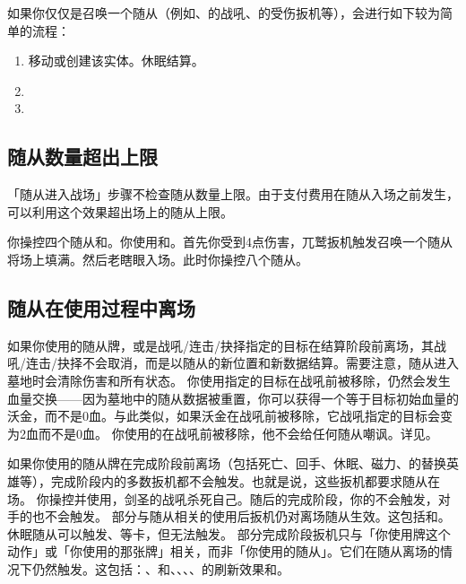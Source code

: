 如果你仅仅是召唤一个随从（例如、的战吼、的受伤扳机等），会进行如下较为简单的流程：
\begin{enumerate}
    \item 移动或创建该实体。休眠结算。
    \item {}
    \item {}
\end{enumerate}

\subsection{随从数量超出上限}

「随从进入战场」步骤不检查随从数量上限。由于支付费用在随从入场之前发生，可以利用这个效果超出场上的随从上限。

\example  你操控四个随从和。你使用和。首先你受到4点伤害，兀鹫扳机触发召唤一个随从将场上填满。然后老瞎眼入场。此时你操控八个随从。

\subsection{随从在使用过程中离场}

如果你使用的随从牌，或是战吼/连击/抉择指定的目标在结算阶段前离场，其战吼/连击/抉择不会取消，而是以随从的新位置和新数据结算。需要注意，随从进入墓地时会清除伤害和所有状态。
\example 你使用指定的目标在战吼前被移除，仍然会发生血量交换——因为墓地中的随从数据被重置，你可以获得一个等于目标初始血量的沃金，而不是0血。与此类似，如果沃金在战吼前被移除，它战吼指定的目标会变为2血而不是0血。
\example 你使用的在战吼前被移除，他不会给任何随从嘲讽。详见。

如果你使用的随从牌在完成阶段前离场（包括死亡、回手、休眠、磁力、的替换英雄等），完成阶段内的多数扳机都不会触发。也就是说，这些扳机都要求随从在场。
\example 你操控并使用，剑圣的战吼杀死自己。随后的完成阶段，你的不会触发，对手的也不会触发。
\exception 部分与随从相关的使用后扳机仍对离场随从生效。这包括和。
\exception 休眠随从可以触发、等卡，但无法触发。
\exception 部分完成阶段扳机只与「你使用牌这个动作」或「你使用的那张牌」相关，而非「你使用的随从」。它们在随从离场的情况下仍然触发。这包括：、和、、、、的刷新效果和。

